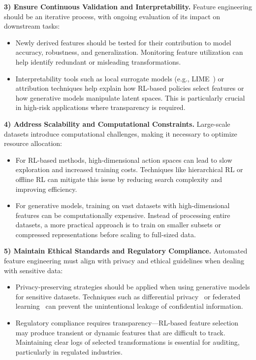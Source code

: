 \noindent
\textbf{3) Ensure Continuous Validation and Interpretability.}
Feature engineering should be an iterative process, with ongoing evaluation of its impact on downstream tasks:
\begin{itemize}
    \item Newly derived features should be tested for their contribution to model accuracy, robustness, and generalization. Monitoring feature utilization can help identify redundant or misleading transformations.
    \item Interpretability tools such as local surrogate models (e.g., LIME~\cite{KDD@LIME}) or attribution techniques help explain how RL-based policies select features or how generative models manipulate latent spaces. This is particularly crucial in high-risk applications where transparency is required.
\end{itemize}

\noindent
\textbf{4) Address Scalability and Computational Constraints.}
Large-scale datasets introduce computational challenges, making it necessary to optimize resource allocation:
\begin{itemize}
    \item For RL-based methods, high-dimensional action spaces can lead to slow exploration and increased training costs. Techniques like hierarchical RL or offline RL can mitigate this issue by reducing search complexity and improving efficiency.
    \item For generative models, training on vast datasets with high-dimensional features can be computationally expensive. Instead of processing entire datasets, a more practical approach is to train on smaller subsets or compressed representations before scaling to full-sized data.
\end{itemize}

\noindent
\textbf{5) Maintain Ethical Standards and Regulatory Compliance.}
Automated feature engineering must align with privacy and ethical guidelines when dealing with sensitive data:
\begin{itemize}
    \item Privacy-preserving strategies should be applied when using generative models for sensitive datasets. Techniques such as differential privacy~\cite{baiprivacy} or federated learning~\cite{kamatchi2025securing} can prevent the unintentional leakage of confidential information.
    \item Regulatory compliance requires transparency—RL-based feature selection may produce transient or dynamic features that are difficult to track. Maintaining clear logs of selected transformations is essential for auditing, particularly in regulated industries.
\end{itemize}
\vspace{-0.2cm}
